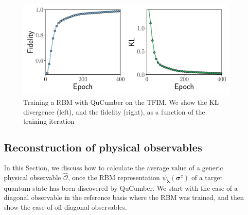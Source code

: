 \documentclass[submission, Phys]{SciPost}
\begin{document}

\begin{figure}[t!]
\noindent \centering{}\includegraphics[width=\columnwidth]{plots/fid_KL}
\caption[The quantum many-body problem]{Training a RBM with QuCumber on the TFIM. We show the KL divergence (left), and the fidelity (right), as a function of the training iteration}
\label{fig:KL} 
\end{figure}


\subsection{Reconstruction of physical observables}
\label{Sec:Sampling_a-Trained_RBM}

In this Section, we discuss how to calculate the average value of a generic physical observable $\hat{\mathcal{O}}$, once the RBM representation $\psi_{\bm{\lambda}}(\bm{\sigma}^z)$ of a target quantum state has been discovered by QuCumber. We start with the case of a diagonal observable in the reference basis where the RBM was trained, and then show the case of off-diagonal observables.
\end{document}
